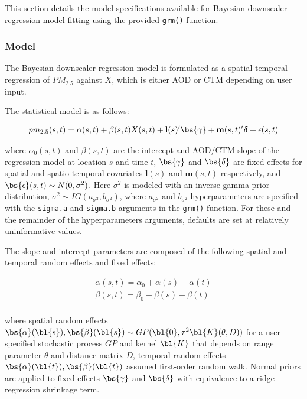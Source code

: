This section details the model specifications available for Bayesian downscaler regression model fitting using the provided \texttt{grm()} function. 

\subsubsection*{Model}

The Bayesian downscaler regression model is formulated as a spatial-temporal regression of $PM_{2.5}$ against $X$, which is either AOD or CTM depending on user input. 

The statistical model is as follows:

\begin{align*} 
    pm_{2.5}(s,t) = \alpha(s, t) + \beta(s, t) X(s, t) + \mathbf{l}(s)' \bs{\gamma} +  \mathbf{m}(s, t)' \boldsymbol{\delta} + \epsilon(s, t)
\end{align*}
         
where $\alpha_0(s, t)$ and $\beta(s, t)$ are the intercept and AOD/CTM slope of the regression model at location $s$ and time $t$, $\bs{\gamma}$ and $\bs{\delta}$ are fixed effects for spatial and spatio-temporal covariates $\mathbf{l}(s)$ and $\mathbf{m}(s, t)$ respectively, and $\bs{\epsilon}(s, t) \sim N(0, \sigma^2)$. Here $\sigma^2$ is modeled with an inverse gamma prior distribution, $\sigma^2 \sim IG(a_{\sigma^2}, b_{\sigma^2})$, where $a_{\sigma^2}$ and $b_{\sigma^2}$ hyperparameters are specified with the \texttt{sigma.a} and \texttt{sigma.b} arguments in the \texttt{grm()} function.
For these and the remainder of the hyperparameters arguments, defaults are set at relatively uninformative values.

The slope and intercept parameters are composed of the following spatial and temporal random effects and fixed effects:

\begin{align*}
    \alpha(s, t) = \alpha_0 + \alpha(s) + \alpha(t) \\
    \beta(s, t) = \beta_0 + \beta(s) + \beta(t) \\
\end{align*} 

where spatial random effects $\bs{\alpha}(\bl{s}), \bs{\beta}(\bl{s}) \sim GP(\bl{0}, \tau^2 \bl{K}(\theta, D))$ for a user specified stochastic process $GP$ and kernel $\bl{K}$ that depends on range parameter $\theta$ and distance matrix $D$, temporal random effects $\bs{\alpha}(\bl{t}), \bs{\beta}(\bl{t})$ assumed first-order random walk.
 Normal priors are applied to fixed effects $\bs{\gamma}$ and $\bs{\delta}$ with equivalence to a ridge regression shrinkage term. 

